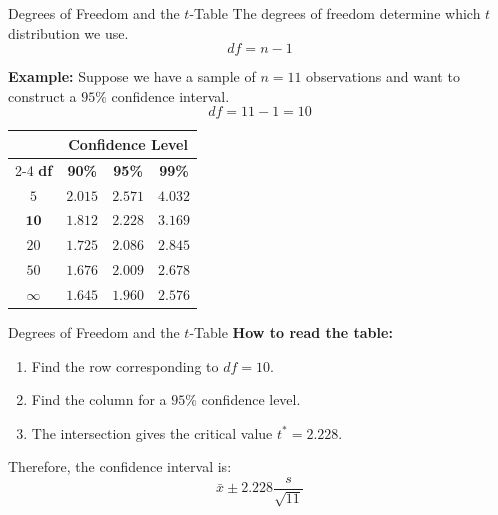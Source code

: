 \documentclass[aspectratio=169,10pt]{beamer}
\begin{document}
\begin{frame}{Degrees of Freedom and the $t$-Table}
The degrees of freedom determine which $t$ distribution we use.
$$\boxed{df=n-1}$$

\vspace{0.1cm}
\textbf{Example:} Suppose we have a sample of $n=11$ observations and want to construct a $95\%$ confidence interval.
$$df=11-1=\boxed{10}$$

\vspace{0.1cm}
\begin{center}
\small
\begin{tabular}{cccc}
\toprule
& \multicolumn{3}{c}{\textbf{Confidence Level}} \\
\cmidrule(lr){2-4}
\textbf{df} & \textbf{90\%} & \textbf{95\%} & \textbf{99\%} \\
\midrule
$5$  & $2.015$ & $2.571$ & $4.032$ \\
$\mathbf{10}$ & $1.812$ & $\boxed{\mathbf{2.228}}$ & $3.169$ \\
$20$ & $1.725$ & $2.086$ & $2.845$ \\
$50$ & $1.676$ & $2.009$ & $2.678$ \\
$\infty$ & $1.645$ & $1.960$ & $2.576$ \\
\bottomrule
\end{tabular}
\end{center}
\end{frame}

\begin{frame}{Degrees of Freedom and the $t$-Table}
\vspace{0.15cm}
\textbf{How to read the table:}
\begin{enumerate}
	\item Find the row corresponding to $df=10$.
	\item Find the column for a $95\%$ confidence level.
	\item The intersection gives the critical value $t^*=2.228$.
\end{enumerate}

\vspace{0.1cm}
Therefore, the confidence interval is:
$$\boxed{\bar{x}\pm 2.228\frac{s}{\sqrt{11}}}$$
\end{frame}
\end{document}
